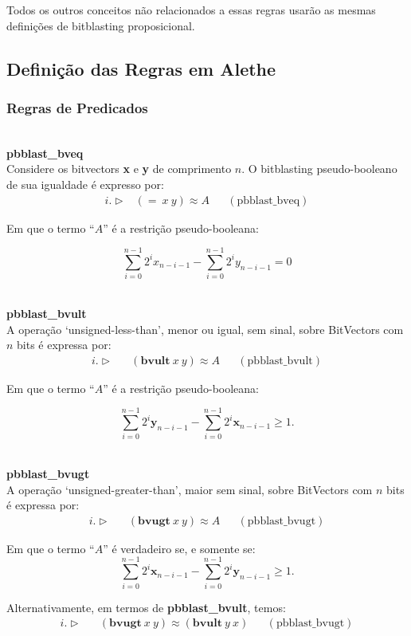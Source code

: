 \documentclass[conference]{IEEEtran}
\begin{document}
Todos os outros conceitos não relacionados a essas regras usarão as mesmas definições de bitblasting proposicional.

\subsection{Definição das Regras em Alethe}
\subsubsection{Regras de Predicados}
\noindent\\
\textbf{pbblast\_bveq}\\
Considere os bitvectors \textbf{x} e \textbf{y} de comprimento $n$.
O bitblasting pseudo-booleano de sua igualdade é expresso por:
\begin{align*}
    i. \vartriangleright & (=\ x\ y) \approx A &  & (\text{pbblast\_bveq})
\end{align*}

Em que o termo ``$A$'' é a restrição pseudo-booleana:

\[ \sum_{i=0}^{n-1}{2^i x_{n-i-1}} - \sum_{i=0}^{n-1}{2^i y_{n-i-1}} = 0\]

\noindent\\
\textbf{pbblast\_bvult}\\
A operação `unsigned-less-than', menor ou igual, sem sinal, sobre BitVectors com $n$ bits é
expressa por:
\begin{align*}
    i. \vartriangleright &  & (\textbf{bvult}\ x\ y) \approx A &  & (\text{pbblast\_bvult})
\end{align*}

Em que o termo ``$A$'' é a restrição pseudo-booleana:

\[
    \sum_{i=0}^{n-1} 2^i\mathbf{y}_{n-i-1} - \sum_{i=0}^{n-1} 2^i\mathbf{x}_{n-i-1} \ge 1.
\]

\noindent\\
\textbf{pbblast\_bvugt}\\
A operação `unsigned-greater-than', maior sem sinal, sobre BitVectors com $n$ bits é expressa por:
\begin{align*}
    i. \vartriangleright &  & (\textbf{bvugt}\ x\ y) \approx A &  & (\text{pbblast\_bvugt})
\end{align*}

Em que o termo ``$A$'' é verdadeiro se, e somente se:
\[
    \sum_{i=0}^{n-1} 2^i\mathbf{x}_{n-i-1} - \sum_{i=0}^{n-1} 2^i\mathbf{y}_{n-i-1} \ge 1.
\]

Alternativamente, em termos de \textbf{pbblast\_bvult}, temos:
\begin{align*}
    i. \vartriangleright &  & (\textbf{bvugt}\ x\ y) \approx (\textbf{bvult}\ y\ x) &  & (\text{pbblast\_bvugt})
\end{align*}
\end{document}
